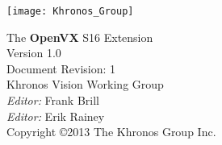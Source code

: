 \documentclass[oneside]{book}
\begin{document}
\hypersetup{pageanchor=false,citecolor=blue}
\begin{titlepage}
\vspace*{2cm}
\texttt{[image: Khronos\_Group]}
\vspace*{2cm}
\begin{center}
{\Huge The {\bf OpenVX\texttrademark} S16 Extension} \\
\vspace*{1cm}
{\Large Version 1.0} \\
\vspace*{0.25cm}
{\Large Document Revision: 1} \\
\vspace*{1cm}
{\Large Khronos Vision Working Group} \\
\vspace*{1cm}
{\Large {\it Editor:} Frank Brill} \\
{\Large {\it Editor:} Erik Rainey} \\
\vspace*{1cm}
{\Large Copyright \copyright 2013 The Khronos Group Inc.} \\
\end{center}
\end{titlepage}
\end{document}
